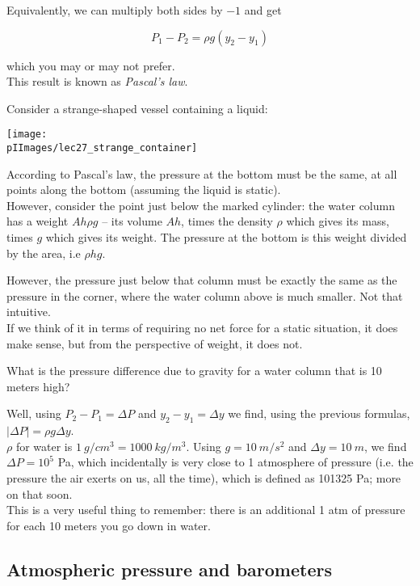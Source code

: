Equivalently, we can multiply both sides by $-1$ and get

\begin{equation}
P_1 - P_2 = \rho g(y_2 - y_1)
\end{equation}

which you may or may not prefer.\\
This result is known as \emph{Pascal's law}.

Consider a strange-shaped vessel containing a liquid:

\begin{center}
\texttt{[image: \\pIImages/lec27\_strange\_container]}
\end{center}

According to Pascal's law, the pressure at the bottom must be the same, at all points along the bottom (assuming the liquid is static).\\
However, consider the point just below the marked cylinder: the water column has a weight $A h \rho g$ -- its volume $A h$, times the density $\rho$ which gives its mass, times $g$ which gives its weight. The pressure at the bottom is this weight divided by the area, i.e $\rho h g$.

However, the pressure just below that column must be exactly the same as the pressure in the corner, where the water column above is much smaller. Not that intuitive.\\
If we think of it in terms of requiring no net force for a static situation, it does make sense, but from the perspective of weight, it does not.

What is the pressure difference due to gravity for a water column that is 10 meters high?

Well, using $P_2 - P_1 = \Delta P$ and $y_2 - y_1 = \Delta y$ we find, using the previous formulas, $|\Delta P| = \rho g \Delta y$.\\
$\rho$ for water is $\SI{1}{g/cm^3} = \SI{1000}{kg/m^3}$. Using $g = \SI{10}{m/s^2}$ and $\Delta y = \SI{10}{m}$, we find $\Delta P = 10^5$ Pa, which incidentally is very close to 1 atmosphere of pressure (i.e. the pressure the air exerts on us, all the time), which is defined as 101325 Pa; more on that soon.\\
This is a very useful thing to remember: there is an additional 1 atm of pressure for each 10 meters you go down in water.

\subsection{Atmospheric pressure and barometers}

